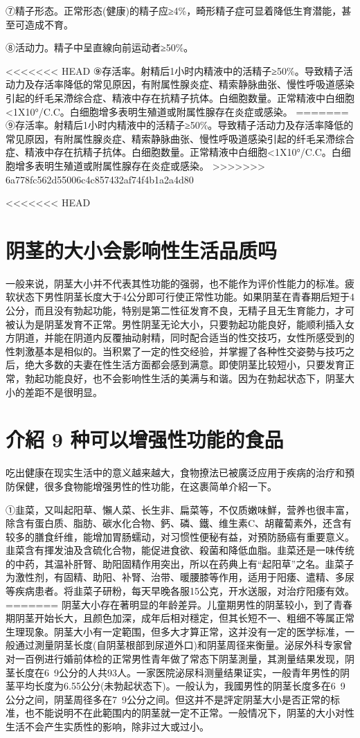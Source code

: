 \documentclass[12pt,UTF8]{ctexbook}
\begin{document}
⑦精子形态。正常形态(健康)的精子应≥4\%，畸形精子症可显着降低生育潜能，甚至可造成不育。

⑧活动力。精子中呈直線向前运动者≥50\%。

<<<<<<< HEAD
⑨存活率。射精后1小时内精液中的活精子≥50\%。导致精子活动力及存活率降低的常见原因，有附属性腺炎症、精索静脉曲张、慢性呼吸道感染引起的纤毛呆滯综合症、精液中存在抗精子抗体。白细胞数量。正常精液中白细胞<1X10°/C.C。白细胞增多表明生殖道或附属性腺存在炎症或感染。
=======
⑨存活率。射精后1小时内精液中的活精子≥50\%。导致精子活动力及存活率降低的常见原因，有附属性腺炎症、精索静脉曲张、慢性呼吸道感染引起的纤毛呆滯综合症、精液中存在抗精子抗体。白细胞数量。正常精液中白细胞<1X10°/C.C。白细胞增多表明生殖道或附属性腺存在炎症或感染。
>>>>>>> 6a778fc562d55006c4c857432af74f4b1a2a4d80


<<<<<<< HEAD

\section{阴茎的大小会影响性生活品质吗}

一般来说，阴茎大小并不代表其性功能的强弱，也不能作为评价性能力的标准。疲软状态下男性阴茎长度大于4公分即可行使正常性功能。如果阴茎在青春期后短于4公分，而且没有勃起功能，特别是第二性征发育不良，无精子且无生育能力，才可被认为是阴茎发育不正常。男性阴茎无论大小，只要勃起功能良好，能顺利插入女方阴道，并能在阴道内反覆抽动射精，同时配合适当的性交技巧，女性所感受到的性刺激基本是相似的。当积累了一定的性交经验，并掌握了各种性交姿勢与技巧之后，绝大多数的夫妻在性生活方面都会感到满意。即使阴茎比较短小，只要发育正常，勃起功能良好，也不会影响性生活的美满与和谐。因为在勃起状态下，阴茎大小的差距不是很明显。

\section{介紹 9 种可以增强性功能的食品}

吃出健康在现实生活中的意义越来越大，食物撩法已被廣泛应用于疾病的治疗和預防保健，很多食物能增强男性的性功能，在这裹简单介紹一下。

①韭菜，又叫起阳草、懶人菜、长生非、扁菜等，不仅质嫩味鮮，营养也很丰富，除含有蛋白质、脂肪、碳水化合物、鈣、磷、鐵、维生素C、胡蘿蔔素外，还含有较多的膳食纤维，能增加胃肠蠕动，对习惯性便秘有益，对預防肠癌有重要意义。韭菜含有揮发油及含硫化合物，能促进食欲、殺菌和降低血脂。韭菜还是一味传统的中药，其温补肝腎、助阳固精作用突出，所以在药典上有“起阳草”之名。韭菜子为激性剂，有固精、助阳、补腎、治带、暖腰膝等作用，适用于阳痿、遣精、多尿等疾病患者。将韭菜子研粉，每天早晚各服15公克，开水送服，对治疗阳痿有效。
=======
阴茎大小存在著明显的年龄差异。儿童期男性的阴茎较小，到了青春期阴茎开始长大，且颜色加深，成年后相对穩定，但其长短不一、粗细不等属正常生理现象。阴茎大小有一定範围，但多大才算正常，这并没有一定的医学标准，一般通过測量阴茎长度(自阴茎根部到尿道外口)和阴茎周径来衡量。泌尿外科专家曾对一百例进行婚前体检的正常男性青年做了常态下阴茎測量，其測量结果发现，阴茎长度在6~9公分的人共93人。一家医院泌尿科测量结果证实，一般青年男性的阴茎平均长度为6.55公分(未勃起状态下)。一般认为，我國男性的阴茎长度多在6~9公分之间，阴茎周径多在7~9公分之间。但这并不是評定阴茎大小是否正常的标准，也不能说明不在此範围内的阴茎就一定不正常。一般情况下，阴茎的大小对性生活不会产生实质性的影响，除非过大或过小。
\end{document}
